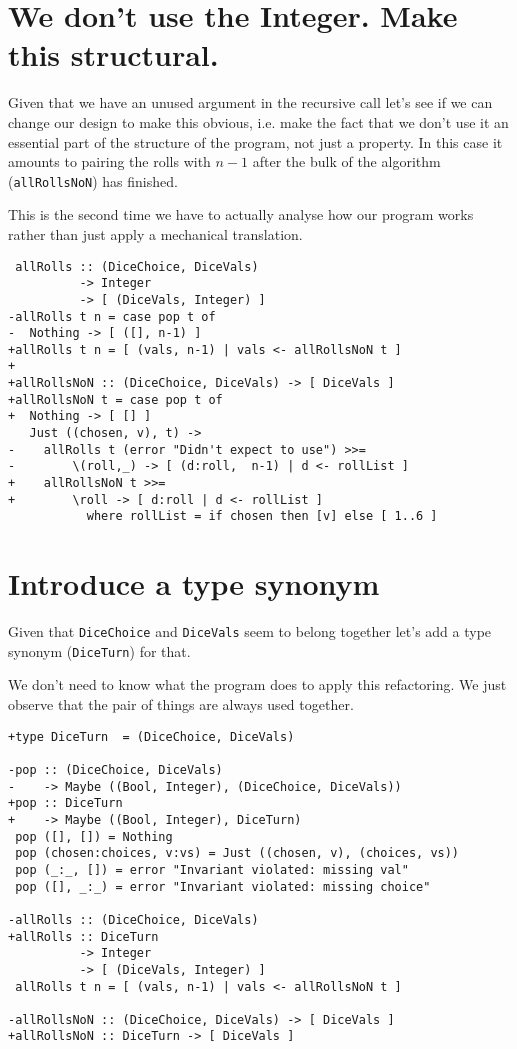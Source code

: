 \section{We don't use the Integer. Make this structural.}


Given that we have an unused argument in the recursive call let's see if we can change our design to make this obvious, i.e. make the fact that we don't use it an essential part of the structure of the program, not just a property. In this case it amounts to pairing the rolls with $n-1$ after the bulk of the algorithm (\texttt{allRollsNoN}) has finished.

This is the second time we have to actually analyse how our program works rather than just apply a mechanical translation.

\begin{verbatim}
 allRolls :: (DiceChoice, DiceVals)
          -> Integer
          -> [ (DiceVals, Integer) ]
-allRolls t n = case pop t of
-  Nothing -> [ ([], n-1) ]
+allRolls t n = [ (vals, n-1) | vals <- allRollsNoN t ]
+
+allRollsNoN :: (DiceChoice, DiceVals) -> [ DiceVals ]
+allRollsNoN t = case pop t of
+  Nothing -> [ [] ]
   Just ((chosen, v), t) ->
-    allRolls t (error "Didn't expect to use") >>=
-        \(roll,_) -> [ (d:roll,  n-1) | d <- rollList ]
+    allRollsNoN t >>=
+        \roll -> [ d:roll | d <- rollList ]
           where rollList = if chosen then [v] else [ 1..6 ]
\end{verbatim}

\section{Introduce a type synonym}


Given that \texttt{DiceChoice} and \texttt{DiceVals} seem to belong together let's add a type synonym (\texttt{DiceTurn}) for that.

We don't need to know what the program does to apply this refactoring. We just observe that the pair of things are always used together.

\begin{verbatim}
+type DiceTurn  = (DiceChoice, DiceVals)

-pop :: (DiceChoice, DiceVals)
-    -> Maybe ((Bool, Integer), (DiceChoice, DiceVals))
+pop :: DiceTurn
+    -> Maybe ((Bool, Integer), DiceTurn)
 pop ([], []) = Nothing
 pop (chosen:choices, v:vs) = Just ((chosen, v), (choices, vs))
 pop (_:_, []) = error "Invariant violated: missing val"
 pop ([], _:_) = error "Invariant violated: missing choice"

-allRolls :: (DiceChoice, DiceVals)
+allRolls :: DiceTurn
          -> Integer
          -> [ (DiceVals, Integer) ]
 allRolls t n = [ (vals, n-1) | vals <- allRollsNoN t ]

-allRollsNoN :: (DiceChoice, DiceVals) -> [ DiceVals ]
+allRollsNoN :: DiceTurn -> [ DiceVals ]
\end{verbatim}


